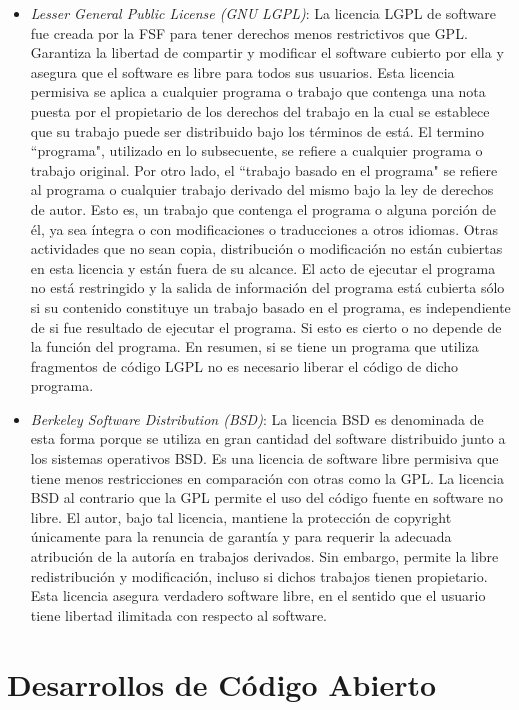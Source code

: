 \begin {itemize}
\item \textit{Lesser General Public License (GNU LGPL)}: La licencia
  LGPL de software fue creada por la FSF para tener derechos menos
  restrictivos que GPL. Garantiza la libertad de compartir y modificar
  el software cubierto por ella y asegura que el software es libre
  para todos sus usuarios. Esta licencia permisiva se aplica a
  cualquier programa o trabajo que contenga una nota puesta por el
  propietario de los derechos del trabajo en la cual se establece que
  su trabajo puede ser distribuido bajo los términos de está. El
  termino ``programa", utilizado en lo subsecuente, se refiere a
  cualquier programa o trabajo original. Por otro lado, el ``trabajo
  basado en el programa" se refiere al programa o cualquier trabajo
  derivado del mismo bajo la ley de derechos de autor. Esto es, un
  trabajo que contenga el programa o alguna porción de él, ya sea
  íntegra o con modificaciones o traducciones a otros idiomas. Otras
  actividades que no sean copia, distribución o modificación no están
  cubiertas en esta licencia y están fuera de su alcance. El acto de
  ejecutar el programa no está restringido y la salida de información
  del programa está cubierta sólo si su contenido constituye un
  trabajo basado en el programa, es independiente de si fue resultado
  de ejecutar el programa. Si esto es cierto o no depende de la
  función del programa. En resumen, si se tiene un programa que
  utiliza fragmentos de código LGPL no es necesario liberar el código
  de dicho programa.

\item \textit{Berkeley Software Distribution (BSD)}: La licencia BSD
  es denominada de esta forma porque se utiliza en gran cantidad del
  software distribuido junto a los sistemas operativos BSD. Es una
  licencia de software libre permisiva que tiene menos restricciones
  en comparación con otras como la GPL. La licencia BSD al contrario
  que la GPL permite el uso del código fuente en software no libre. El
  autor, bajo tal licencia, mantiene la protección de copyright
  únicamente para la renuncia de garantía y para requerir la adecuada
  atribución de la autoría en trabajos derivados. Sin embargo, permite
  la libre redistribución y modificación, incluso si dichos trabajos
  tienen propietario. Esta licencia asegura verdadero software libre,
  en el sentido que el usuario tiene libertad ilimitada con respecto
  al software.
\end {itemize}

\section{Desarrollos de Código Abierto}

